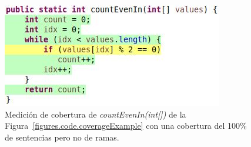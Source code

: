 \begin{figure}
	\centering
	\includegraphics[width=.90\linewidth]{figures/branchCoverageExampleIncomplete.JPG}
	\caption[Cobertura de sentencias del 100\% para \emph{countEvenIn(int[])}]{Medici\'on de cobertura de \emph{countEvenIn(int[])} de la Figura~\ref{figures.code.coverageExample} con una cobertura del 100\% de sentencias pero no de ramas.}
	\label{figures.examples.coverage.stmtCoverage}
\end{figure}

